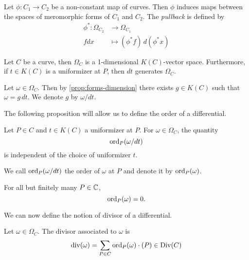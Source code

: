 \begin{definition}
	Let $\phi: C_1 \to C_2$ be a non-constant map of curves. Then $\phi$ induces
	maps between the spaces of meromorphic forms of $C_1$ and $C_2$.
	The \emph{pullback} is defined by
	\begin{align*}
		\phi^*: \Omega_{C_2} &\to \Omega_{C_1}\\
		fdx &\mapsto (\phi^* f)\,d(\phi^* x)
	\end{align*}
\end{definition}

\begin{proposition}
	\label{prop:forms-dimension}
	Let $C$ be a curve, then $\Omega_C$ is a 1-dimensional $K(C)$-vector space.
	Furthermore, if $t \in K(C)$ is a uniformizer at $P$,
	then $dt$ generates $\Omega_C$.
\end{proposition}

\begin{notation}
	Let $\omega \in \Omega_C$. Then by \ref{prop:forms-dimension} there exists
	$g \in K(C)$ such that $\omega = g\,dt$. We denote $g$ by $\omega/dt$.
\end{notation}

The following proposition will allow us to define the order of a differential.
\begin{proposition}
	Let $P \in C$ and $t \in K(C)$ a uniformizer at $P$. For $\omega \in
	\Omega_C$,
	the quantity
	\begin{equation*}
		\operatorname{ord}_P(\omega/dt)
	\end{equation*}
	is independent of the choice of uniformizer $t$.
\end{proposition}

\begin{definition}
	We call $\operatorname{ord}_P(\omega/dt)$ the order of $\omega$ at $P$ and denote it by
	$\operatorname{ord}_P(\omega)$.
\end{definition}

\begin{proposition}
	For all but finitely many $P \in \mathbb{C}$, 
	\begin{equation*}
		\operatorname{ord}_P(\omega) = 0.
	\end{equation*}
\end{proposition}

We can now define the notion of divisor of a differential.
\begin{definition}
	Let $\omega \in \Omega_C$. The divisor associated to $\omega$ is
	\begin{equation*}
		\operatorname{div}(\omega) = \sum_{P \in C} \operatorname{ord}_P(\omega)\cdot (P) \in \operatorname{Div}(C)
	\end{equation*}
\end{definition}

